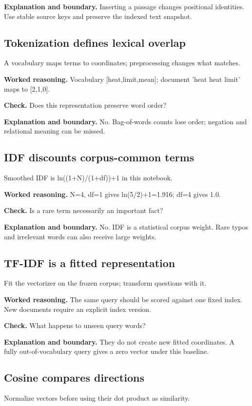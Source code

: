 \textbf{Explanation and boundary.} Inserting a passage changes positional identities. Use stable source keys and preserve the indexed text snapshot.

\subsection{Tokenization defines lexical overlap}
A vocabulary maps terms to coordinates; preprocessing changes what matches.

\textbf{Worked reasoning.} Vocabulary [heat,limit,mean]; document 'heat heat limit' maps to [2,1,0].

\textbf{Check.} Does this representation preserve word order?

\textbf{Explanation and boundary.} No. Bag-of-words counts lose order; negation and relational meaning can be missed.

\subsection{IDF discounts corpus-common terms}
Smoothed IDF is ln((1+N)/(1+df))+1 in this notebook.

\textbf{Worked reasoning.} N=4, df=1 gives ln(5/2)+1=1.916; df=4 gives 1.0.

\textbf{Check.} Is a rare term necessarily an important fact?

\textbf{Explanation and boundary.} No. IDF is a statistical corpus weight. Rare typos and irrelevant words can also receive large weights.

\subsection{TF-IDF is a fitted representation}
Fit the vectorizer on the frozen corpus; transform questions with it.

\textbf{Worked reasoning.} The same query should be scored against one fixed index. New documents require an explicit index version.

\textbf{Check.} What happens to unseen query words?

\textbf{Explanation and boundary.} They do not create new fitted coordinates. A fully out-of-vocabulary query gives a zero vector under this baseline.

\subsection{Cosine compares directions}
Normalize vectors before using their dot product as similarity.

